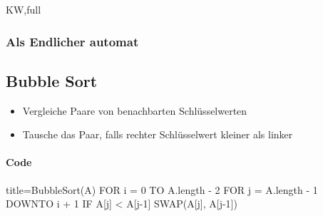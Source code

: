\documentclass[
    ngerman,
    color=3b,
    dark_mode,
    summary,
    boxarc,
]{rubos-tuda-template}
\begin{document}
\begin{taggedblock}{KW,full}
    \subsubsection{Als Endlicher automat}\label{BOFAStringMatching}
    \begin{figure}[h]
        \centering
        
    \end{figure}
    \clearpage
\end{taggedblock}
%
\subsection{Bubble Sort}\label{BubbleSort}
\begin{idea}\mbox{}
    \begin{itemize}
        \item Vergleiche Paare von benachbarten Schlüsselwerten
        \item Tausche das Paar, falls rechter Schlüsselwert kleiner als linker
    \end{itemize}
\end{idea}

\paragraph{Code}\mbox{}
\begin{codeBlock}[autogobble]{title=BubbleSort(A)}
    FOR i = 0 TO A.length - 2
        FOR j = A.length - 1 DOWNTO i + 1
            IF A[j] < A[j-1]
                SWAP(A[j], A[j-1])
\end{codeBlock}
\end{document}
